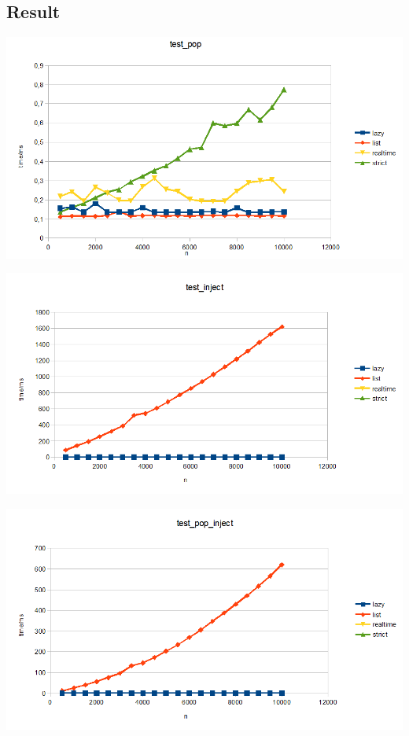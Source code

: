 \subsection{Result}
\includegraphics[scale=0.7]{Graphs/test_pop.png}


\includegraphics[scale=0.7]{Graphs/test_inject.png}


\includegraphics[scale=0.7]{Graphs/test_pop_inject.png}


